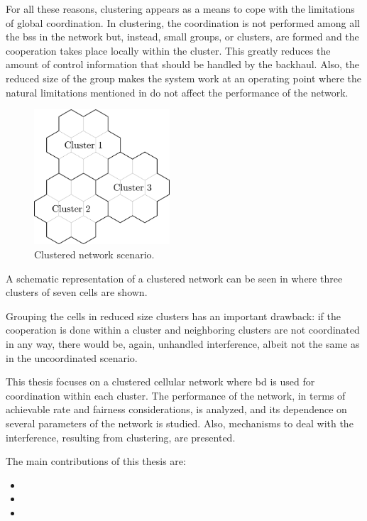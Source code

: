 For all these reasons, clustering appears as a means to cope with the
limitations of global coordination. In clustering, the coordination is not
performed among all the \glspl{bs} in the network but, instead, small groups, or
clusters, are formed and the cooperation takes place locally within the cluster.
This greatly reduces the amount of control information that should be handled by
the backhaul. Also, the reduced size of the group makes the system work at an
operating point where the natural limitations mentioned in \cite{lozano13} do
not affect the performance of the network.

\begin{figure}[t]
    \centering
    \includegraphics[width=0.45\textwidth]{./01.introduction/img/clustered_network}
    \caption{Clustered network scenario.}
    \label{fig:clustered_network}
\end{figure}

A schematic representation of a clustered network can be seen in
 where three clusters of seven cells are shown.

Grouping the cells in reduced size clusters has an important drawback: if the
cooperation is done within a cluster and neighboring clusters are not
coordinated in any way, there would be, again, unhandled interference, albeit
not the same as in the uncoordinated scenario.

This thesis focuses on a clustered cellular network where \gls{bd} is used for
coordination within each cluster. The performance of the network, in terms of
achievable rate and fairness considerations, is analyzed, and its dependence on
several parameters of the network is studied. Also, mechanisms to deal with the
interference, resulting from clustering, are presented.

The main contributions of this thesis are:

\begin{itemize}
    \item {}
    \item {}
    \item {}
\end{itemize}

